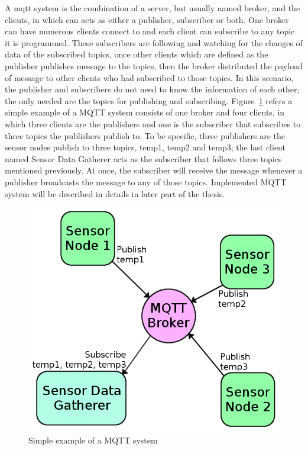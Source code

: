     A \gls{mqtt} system is the combination of a server, but usually named broker, and the clients, in which can acts as either a publisher, subscriber or both. One broker can have numerous clients connect to and each client can subscribe to any topic it is programmed. These subscribers are following and watching for the changes of data of the subscribed topics, once other clients which are defined as the publisher publishes message to the topics, then the broker distributed the payload of message to other clients who had subscribed to those topics. In this scenario, the publisher and subscribers do not need to know the information of each other, the only needed are the topics for publishing and subscribing. Figure~\ref{fig:mqttEg} refers a simple example of a MQTT system consists of one broker and four clients, in which three clients are the publishers and one is the subscriber that subscribes to three topics the publishers publish to. To be specific, three publishers are the sensor nodes publish to three topics, temp1, temp2 and temp3; the last client named Sensor Data Gatherer acts as the subscriber that follows three topics mentioned previously. At once, the subscriber will receive the message whenever a publisher broadcasts the message to any of those topics. Implemented MQTT system will be described in details in later part of the thesis.
    \begin{figure}[!ht]
      \begin{center}
        \includegraphics[scale=0.4]{images/mqttEg.png}
        \caption{Simple example of a MQTT system}
        \label{fig:mqttEg}
      \end{center}
    \end{figure}

